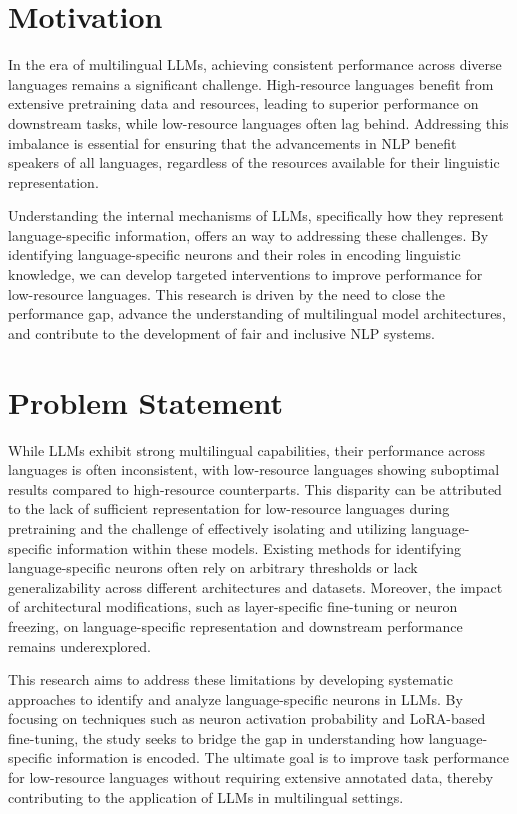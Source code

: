 \section{Motivation}

In the era of multilingual LLMs, achieving consistent performance across diverse languages remains a significant challenge. High-resource languages benefit from extensive pretraining data and resources, leading to superior performance on downstream tasks, while low-resource languages often lag behind. Addressing this imbalance is essential for ensuring that the advancements in NLP benefit speakers of all languages, regardless of the resources available for their linguistic representation.

Understanding the internal mechanisms of LLMs, specifically how they represent language-specific information, offers an way to addressing these challenges. By identifying language-specific neurons and their roles in encoding linguistic knowledge, we can develop targeted interventions to improve performance for low-resource languages. This research is driven by the need to close the performance gap, advance the understanding of multilingual model architectures, and contribute to the development of fair and inclusive NLP systems.

\section{Problem Statement}

While LLMs exhibit strong multilingual capabilities, their performance across languages is often inconsistent, with low-resource languages showing suboptimal results compared to high-resource counterparts. This disparity can be attributed to the lack of sufficient representation for low-resource languages during pretraining and the challenge of effectively isolating and utilizing language-specific information within these models. Existing methods for identifying language-specific neurons often rely on arbitrary thresholds or lack generalizability across different architectures and datasets. Moreover, the impact of architectural modifications, such as layer-specific fine-tuning or neuron freezing, on language-specific representation and downstream performance remains underexplored.

This research aims to address these limitations by developing systematic approaches to identify and analyze language-specific neurons in LLMs. By focusing on techniques such as neuron activation probability and LoRA-based fine-tuning, the study seeks to bridge the gap in understanding how language-specific information is encoded. The ultimate goal is to improve task performance for low-resource languages without requiring extensive annotated data, thereby contributing to the application of LLMs in multilingual settings.



 